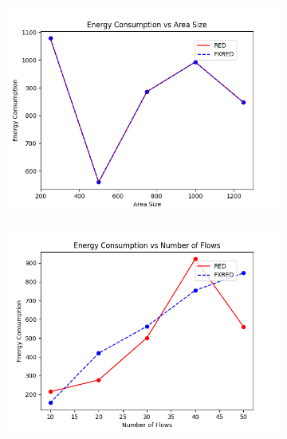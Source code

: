 \documentclass[10pt]{report}
\begin{document}
\begin{figure}
    \centering
    \begin{subfigure}{.5\textwidth}
        \includegraphics[width=1\linewidth]{static/graphs/wireless/Energy Consumption vs Area Size.png}
    \end{subfigure}%
    \begin{subfigure}{.5\textwidth}
        \includegraphics[width=1\linewidth]{static/graphs/wireless/Energy Consumption vs Number of Flows.png}
    \end{subfigure}
    \begin{subfigure}{.5\textwidth}

\end{subfigure}
\end{figure}
\end{document}
